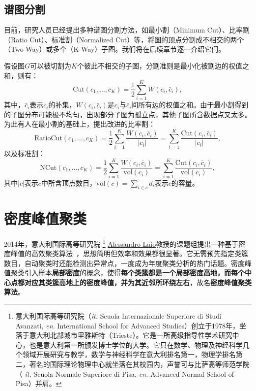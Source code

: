 \subsection{谱图分割}
目前，研究人员已经提出多种谱图分割方法，如最小割（Minimum Cut）、比率割（Ratio Cut）、标准割（Normalized Cut）等，将图的顶点分割成不相交的两个（Two-Way）或多个（K-Way）子图。我们将在后续章节逐一介绍它们。

假设图$G$可以被切割为$K$个彼此不相交的子图，分割准则是最小化被割边的权值之和，则有：
\begin{equation}\label{eq:mincut}
    \text{Cut}(c_1,\ldots, c_K) = \frac{1}{2} \sum\limits_{i=1}^K W(c_i,\bar c_i),
\end{equation}
其中，$\bar c_i$表示$c_i$的补集，$W(c_i,\bar c_i)$是$c_i$与$\bar c_i$间所有边的权值之和。由于最小割得到的子图分布可能极不均匀，出现部分子图为孤立点，其他子图所含数据点又太多。为此有人在最小割的基础上，提出改进的比率割：
\begin{equation}\label{eq:ratiocut}
    \text{RatioCut}(c_1,\ldots,c_K) = \frac{1}{2} \sum\limits_{i=1}^K \frac{W(c_i,\bar c_i)}{|c_i|} = \sum\limits_{i=1}^K \frac{\text{Cut}(c_i,\bar c_i)}{|c_i|},
\end{equation}
以及标准割：
\begin{equation}\label{eq:ratiocut}
    \text{NCut}(c_1,\ldots,c_K) = \frac{1}{2} \sum\limits_{i=1}^K \frac{W(c_i,\bar c_i)}{\text{vol}(c_i)} = \sum\limits_{i=1}^K \frac{\text{Cut}(c_i,\bar c_i)}{\text{vol}(c_i)},
\end{equation}
其中$|c|$表示$c$中所含顶点数目，$\text{vol}(c)=\sum\limits_{i\in c} d_i$表示$c$的容量。

\section{密度峰值聚类}
2014年，意大利国际高等研究院
\footnote{意大利国际高等研究院（\textit{it.} Scuola Internazionale Superiore di Studi Avanzati, \textit{en.} International School for Advanced Studies）创立于1978年，坐落于意大利北部城市里雅斯特（Trieste）。它是一所高级指导性学术研究中心，也是意大利第一所颁发博士学位的大学。它只在数学、物理及神经科学几个领域开展研究与教学，数学与神经科学在意大利排名第一，物理学排名第二，著名的国际理论物理中心就坐落在其校园内，声誉可与比萨高等师范学院（
\textit{it.} Scuola Normale Superiore di Pisa, \textit{en.} Advanced Normal School of Pisa）并肩。}
\href{http://people.sissa.it/~laio/index.html}{Alessandro Laio}教授的课题组提出一种基于密度峰值的高效聚类算法~\cite{rodriguez2014clustering}，思想简明但效率和效果都很显著。它无需预先指定类簇数目，自动聚类时还能检测出异常点，一度成为年度聚类分析的热门话题。密度峰值聚类引入样本\textbf{局部密度}的概念，使得\textbf{每个类簇都是一个局部密度高地，而每个中心点都对应其类簇高地上的密度峰值，并为其近邻所环绕左右}，故名\textbf{密度峰值聚类算法}。

